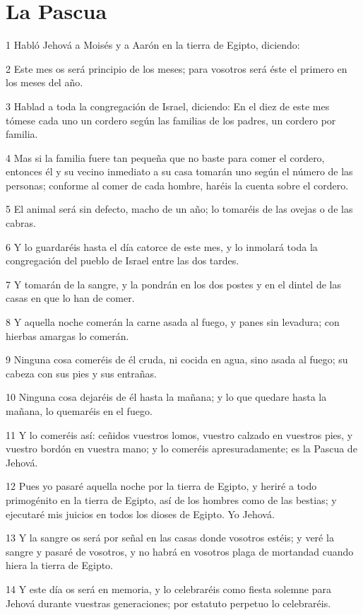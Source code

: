 \section*{La Pascua}

\par 1 Habló Jehová a Moisés y a Aarón en la tierra de Egipto, diciendo:
\par 2 Este mes os será principio de los meses; para vosotros será éste el primero en los meses del año.
\par 3 Hablad a toda la congregación de Israel, diciendo: En el diez de este mes tómese cada uno un cordero según las familias de los padres, un cordero por familia.
\par 4 Mas si la familia fuere tan pequeña que no baste para comer el cordero, entonces él y su vecino inmediato a su casa tomarán uno según el número de las personas; conforme al comer de cada hombre, haréis la cuenta sobre el cordero.
\par 5 El animal será sin defecto, macho de un año; lo tomaréis de las ovejas o de las cabras.
\par 6 Y lo guardaréis hasta el día catorce de este mes, y lo inmolará toda la congregación del pueblo de Israel entre las dos tardes.
\par 7 Y tomarán de la sangre, y la pondrán en los dos postes y en el dintel de las casas en que lo han de comer.
\par 8 Y aquella noche comerán la carne asada al fuego, y panes sin levadura; con hierbas amargas lo comerán.
\par 9 Ninguna cosa comeréis de él cruda, ni cocida en agua, sino asada al fuego; su cabeza con sus pies y sus entrañas.
\par 10 Ninguna cosa dejaréis de él hasta la mañana; y lo que quedare hasta la mañana, lo quemaréis en el fuego.
\par 11 Y lo comeréis así: ceñidos vuestros lomos, vuestro calzado en vuestros pies, y vuestro bordón en vuestra mano; y lo comeréis apresuradamente; es la Pascua de Jehová.
\par 12 Pues yo pasaré aquella noche por la tierra de Egipto, y heriré a todo primogénito en la tierra de Egipto, así de los hombres como de las bestias; y ejecutaré mis juicios en todos los dioses de Egipto. Yo Jehová.
\par 13 Y la sangre os será por señal en las casas donde vosotros estéis; y veré la sangre y pasaré de vosotros, y no habrá en vosotros plaga de mortandad cuando hiera la tierra de Egipto.
\par 14 Y este día os será en memoria, y lo celebraréis como fiesta solemne para Jehová durante vuestras generaciones; por estatuto perpetuo lo celebraréis.
